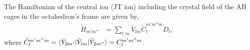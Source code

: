 \documentclass[a4paper,prb,twocolumn]{revtex4-1}  %
\newcommand{\com}[1]{}
\begin{document}
\com{
\begin{align}
\text{Vlm}(2,-2)&=  \frac{64}{81} \sqrt{\frac{\pi }{5}} \alpha ^2 \left(\beta ^2-6\right),\\
\text{Vlm}(2,0)&=  \frac{64}{27} \sqrt{\frac{\pi }{15}} \left(2 \left(\alpha ^2+3\right) \beta ^2-3 \alpha ^2\right),\\
\text{Vlm}(4,-2)&=  \frac{1}{243} (-256) \sqrt{\frac{5 \pi }{3}} \alpha ^2 \left(9 \beta ^2+5\right),\\\text{Vlm}(4,0)&=  \frac{1}{243} (-128) \sqrt{\frac{\pi }{3}} \left(5 \alpha ^2 \left(11 \beta ^2+4\right)+30 \beta ^2+14\right),\\
\text{Vlm}(4,4)&=  \frac{1}{243} (-128) \sqrt{\frac{35 \pi }{3}} \left(\alpha ^2 \left(5 \beta ^2+4\right)+2 \left(\beta ^2+1\right)\right)
 \end{align}
\begin{align}
\text{Vlm}(2,-2)&=  \sqrt{\frac{3 \pi }{5}} \alpha ^2 \left(3 \beta ^2+2\right),\\
\text{Vlm}(2,0)&=  \frac{1}{2} (-3) \sqrt{\frac{\pi }{5}} \left(\alpha ^2 \left(3 \beta ^2-2\right)+4 \beta ^2\right),\\
\text{Vlm}(4,-2)&=  -\frac{1}{6} \sqrt{5 \pi } \alpha ^2 \left(5 \beta ^2+2\right),\\
\text{Vlm}(4,0)&=  \frac{1}{24} \sqrt{\pi } \left(5 \alpha ^2 \left(15 \beta ^2+22\right)+60 \beta ^2+56\right),\\
\text{Vlm}(4,4)&=  \frac{1}{24} \sqrt{35 \pi } \left(5 \alpha ^2+4\right) \left(5 \beta ^2+2\right)
 \end{align}
}




\com{ Considering an octahedron,.... which one?
 why only one but not all four?
 spectra of all octahedra are similar...???
}

\com{V20, JT:\\
V2-2, V4-2, couple yz and zx.
But... rotation.... produce all m components in general, ....
}


The Hamiltonian of the central ion (JT ion) including 
the crystal field of the AB cages 
in the octahedron's frame %
are given by,
\begin{align}
\tilde H_{m' m''} &= \sum_{l,m} \tilde V_{l m} \tilde C_{l}^{m'm''m} D_{l} ,
\end{align}
where %
$\tilde C_{l}^{m'm''m}=\braket{\tilde Y_{2m'}|\tilde Y_{lm}|\tilde Y_{2m''}}= C_{l}^{m'm''m}$. 
\end{document}
